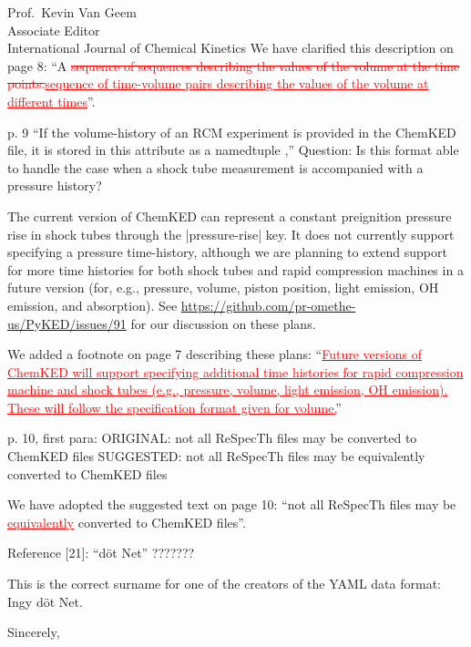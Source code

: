 \documentclass[11pt]{OSUletter}
\newcommand{\addtwo}[1]{{\sloppy\textcolor{red}{\uline{#1}}}}  %
\newcommand{\deletetwo}[1]{\sloppy\textcolor{red}{\sout{#1}}}    %
\begin{document}
\begin{letter}{
               Prof.~Kevin Van Geem\\
               Associate Editor\\
               International Journal of Chemical Kinetics
               }
We have clarified this description on page 8:
``A \deletetwo{sequence of sequences describing the values of
the volume at the time points.}\addtwo{sequence of time-volume pairs describing the values
of the volume at different times}''.

\begin{quoting}
    p. 9
    ``If the volume-history of an RCM experiment is provided in the
    ChemKED file, it is stored in this attribute as a namedtuple ,''
    Question: Is this format able to handle the case when a shock tube measurement
    is accompanied with a pressure history?
\end{quoting}

The current version of ChemKED can represent a constant preignition pressure rise
in shock tubes through the \yabox|pressure-rise| key. It does not currently
support specifying a pressure time-history, although we are planning to extend
support for more time histories for both shock tubes and rapid compression
machines in a future version (for, e.g., pressure, volume, piston position, light
emission, OH emission, and absorption). See \url{https://github.com/pr-omethe-us/PyKED/issues/91}
for our discussion on these plans.

We added a footnote on page 7 describing these plans:
``\addtwo{Future versions of ChemKED will support specifying additional time histories for
rapid compression machine and shock tubes (e.g., pressure, volume, light emission, OH emission).
These will follow the specification format given for volume.}''

\begin{quoting}
    p. 10, first para:
    ORIGINAL:
    not all ReSpecTh files may be converted to ChemKED files
    SUGGESTED:
    not all ReSpecTh files may be equivalently converted to ChemKED files
\end{quoting}

We have adopted the suggested text on page 10:
``not all ReSpecTh files may be \addtwo{equivalently} converted to ChemKED files''.

\begin{quoting}
    Reference [21]:
    ``döt Net''   ???????
\end{quoting}

This is the correct surname for one of the creators of the YAML data format: Ingy döt Net.

\vspace{1em}

\closing{Sincerely,}




\end{letter}
\end{document}

